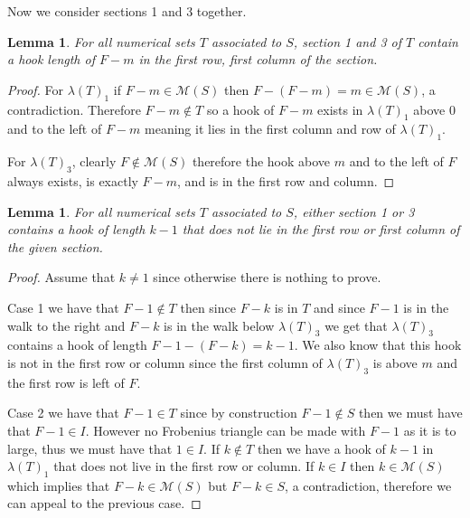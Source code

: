 \documentclass[11pt,letterpaper]{article}
\newtheorem{lem}[thm]{Lemma}
\theoremstyle{definition}
\begin{document}
Now we consider sections 1 and 3 together.


\begin{lem}
    \label{F-m length}
    For all numerical sets $T$ associated to $S$, section 1 and 3 of $T$ contain a hook length of $F-m$ in the first row, first column of the section.
\end{lem}

\begin{proof}
    For $\lambda(T)_1$ if $F-m\in\mathcal{M}(S)$ then $F-(F-m)=m\in\mathcal{M}(S)$, a contradiction. Therefore $F-m\notin T$ so a hook of $F-m$ exists in $\lambda(T)_1$ above 0 and to the left of $F-m$ meaning it lies in the first column and row of $\lambda(T)_1$. 

    For $\lambda(T)_3$, clearly $F\notin\mathcal{M}(S)$ therefore the hook above $m$ and to the left of $F$ always exists, is exactly $F-m$, and is in the first row and column.
\end{proof}



\begin{lem}
    \label{k-1 hook}
    For all numerical sets $T$ associated to $S$, either section 1 or 3 contains a hook of length $k-1$ that does not lie in the first row or first column of the given section.
\end{lem}

\begin{proof}
    Assume that $k\neq 1$ since otherwise there is nothing to prove.
    
    Case 1 we have that $F-1\notin T$ then since $F-k$ is in $T$ and since $F-1$ is in the walk to the right and $F-k$ is in the walk below $\lambda(T)_3$ we get that $\lambda(T)_3$ contains a hook of length $F-1-(F-k)=k-1$. We also know that this hook is not in the first row or column since the first column of $\lambda(T)_3$ is above $m$ and the first row is left of $F$.
    
    Case 2 we have that $F-1\in T$ since by construction $F-1\notin S$ then we must have that $F-1\in I$. However no Frobenius triangle can be made with $F-1$ as it is to large, thus we must have that $1\in I$. If $k\notin T$ then we have a hook of $k-1$ in $\lambda(T)_1$ that does not live in the first row or column. If $k\in I$ then $k\in\mathcal{M}(S)$ which implies that $F-k\in\mathcal{M}(S)$ but $F-k\in S$, a contradiction, therefore we can appeal to the previous case.
\end{proof}
\end{document}

